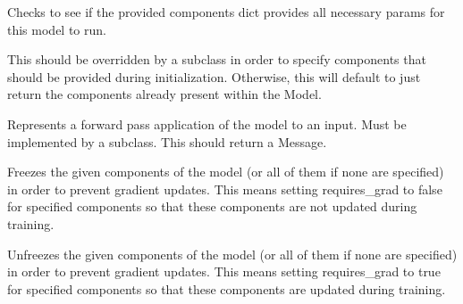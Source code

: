 \documentclass[letterpaper,10pt,english]{sphinxmanual}
\begin{document}
\begin{fulllineitems}
\begin{fulllineitems}
\label{\detokenize{Fireworks:Fireworks.core.model.Model.check_components}}
Checks to see if the provided components dict provides all necessary params for this model to run.

\end{fulllineitems}


\begin{fulllineitems}
\label{\detokenize{Fireworks:Fireworks.core.model.Model.required_components}}
This should be overridden by a subclass in order to specify components that should be provided during initialization. Otherwise,
this will default to just return the components already present within the Model.

\end{fulllineitems}


\begin{fulllineitems}
\label{\detokenize{Fireworks:Fireworks.core.model.Model.forward}}
Represents a forward pass application of the model to an input. Must be implemented by a subclass.
This should return a Message.

\end{fulllineitems}


\begin{fulllineitems}
\label{\detokenize{Fireworks:Fireworks.core.model.Model.freeze}}
Freezes the given components of the model (or all of them if none are specified) in order to prevent gradient updates.
This means setting requires\_grad to false for specified components so that these components
are not updated during training.

\end{fulllineitems}


\begin{fulllineitems}
\label{\detokenize{Fireworks:Fireworks.core.model.Model.unfreeze}}
Unfreezes the given components of the model (or all of them if none are specified) in order to prevent gradient updates.
This means setting requires\_grad to true for specified components so that these components
are updated during training.

\end{fulllineitems}


\end{fulllineitems}
\end{document}
